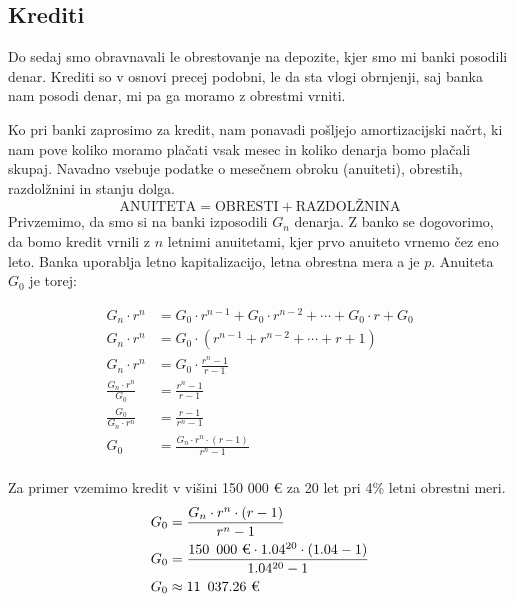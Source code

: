 \documentclass[12pt]{article}
\begin{document}
    \subsection{Krediti}
    Do sedaj smo obravnavali le obrestovanje na depozite, kjer smo mi banki posodili denar.
    Krediti so v osnovi precej podobni, le da sta vlogi obrnjenji, saj banka nam posodi
    denar, mi pa ga moramo z obrestmi vrniti.

    Ko pri banki zaprosimo za kredit, nam ponavadi pošljejo amortizacijski načrt, ki nam
    pove koliko moramo plačati vsak mesec in koliko denarja bomo plačali skupaj. Navadno
    vsebuje podatke o mesečnem obroku (anuiteti), obrestih, razdolžnini in 
    stanju dolga. 
    $$\text{ANUITETA} = \text{OBRESTI} + \text{RAZDOLŽNINA}$$
    Privzemimo, da smo si na banki izposodili $G_n$ denarja. Z banko se dogovorimo, da bomo
    kredit vrnili z $n$ letnimi anuitetami, kjer prvo anuiteto vrnemo čez eno leto. Banka
    uporablja letno kapitalizacijo, letna obrestna mera a je $p$. Anuiteta $G_0$ je torej:
    
    \begin{equation}
        \begin{split}
            G_n \cdot r^n & = G_0 \cdot r^{n - 1} + G_0 \cdot r^{n - 2} + \cdots + G_0 \cdot r + G_0 \\
            G_n \cdot r^n & = G_0 \cdot (r^{n - 1} + r^{n - 2} + \cdots + r + 1) \\
            G_n \cdot r^n & = G_0 \cdot \frac{r^n - 1}{r - 1} \\
            \frac{G_n \cdot r^n}{G_0} & = \frac{r^n - 1}{r - 1} \\
            \frac{G_0}{G_n \cdot r^n} & = \frac{r - 1}{r^n - 1} \\
            G_0 & = \frac{G_n \cdot r^n \cdot (r - 1)}{r^n - 1} \\
        \end{split}
    \end{equation}

    Za primer vzemimo kredit v višini 150 000 € za 20 let pri 4\% letni obrestni meri. 
    \begin{equation}
        \begin{split}
            G_0 & = \frac{G_n \cdot r^n \cdot (r - 1)}{r^n - 1} \\
            G_0 & = \frac{150 \enskip 000 \text{ €} \cdot 1.04^{20} \cdot (1.04 - 1)}{1.04^{20} - 1} \\
            G_0 & \approx 11 \enskip 037.26 \text{ €}
        \end{split}
    \end{equation}
\end{document}

